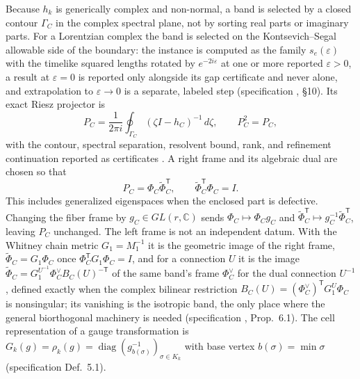 \documentclass[11pt,letterpaper]{article}
\begin{document}
Because $h_k$ is generically complex and non-normal, a band is selected by a
closed contour $\Gamma_C$ in the complex spectral plane, not by sorting real
parts or imaginary parts. For a Lorentzian complex the band is selected on the
Kontsevich--Segal allowable side of the boundary: the instance is computed as
the family $s_e(\varepsilon)$ with the timelike squared lengths rotated by
$e^{-2i\varepsilon}$ at one or more reported $\varepsilon>0$, a result at
$\varepsilon=0$ is reported only alongside its gap certificate and never
alone, and extrapolation to $\varepsilon\to0$ is a separate, labeled step
(specification \cite{whitneyspec}, \S10). Its exact Riesz projector is
\begin{equation*}
  P_C=\frac{1}{2\pi i}\oint_{\Gamma_C}
       (\zeta I-h_C)^{-1}\,d\zeta ,
  \qquad P_C^2=P_C ,
\end{equation*}
with the contour, spectral separation, resolvent bound, rank, and refinement
continuation reported as certificates \cite{kato1995}. A right frame and its
algebraic dual are chosen so that
\begin{equation*}
  P_C=\Phi_C\widetilde\Phi_C^{\mathsf T},
  \qquad
  \widetilde\Phi_C^{\mathsf T}\Phi_C=I .
\end{equation*}
This includes generalized eigenspaces when the enclosed part is defective.
Changing the fiber frame by $g_C\in GL(r,\mathbb C)$ sends
$\Phi_C\mapsto\Phi_Cg_C$ and
$\widetilde\Phi_C^{\mathsf T}\mapsto
g_C^{-1}\widetilde\Phi_C^{\mathsf T}$, leaving $P_C$ unchanged.
The left frame is not an independent datum. With the Whitney chain metric
$G_1=M_1^{-1}$ it is the geometric image of the right frame,
$\widetilde\Phi_C=G_1\Phi_C$ once $\Phi_C^{\mathsf T}G_1\Phi_C=I$, and for a
connection $U$ it is the image
$\widetilde\Phi_C=G_1^{U^{-1}}\Phi_C^{\vee}B_C(U)^{-\mathsf T}$ of the same
band's frame $\Phi_C^{\vee}$ for the dual connection $U^{-1}$, defined exactly
when the complex bilinear restriction
$B_C(U)=(\Phi_C^{\vee})^{\mathsf T}G_1^{U}\Phi_C$ is nonsingular; its
vanishing is the isotropic band, the only place where the general
biorthogonal machinery is needed (specification \cite{whitneyspec},
Prop.~6.1). The cell representation of a gauge transformation is
$G_k(g)=\rho_k(g)=\operatorname{diag}(g_{b(\sigma)}^{-1})_{\sigma\in K_k}$
with base vertex $b(\sigma)=\min\sigma$ (specification Def.~5.1).
\end{document}
